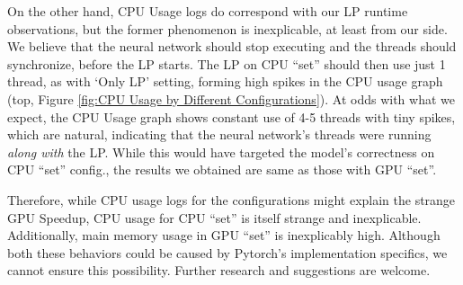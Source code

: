 \begin{appendices}
    On the other hand, CPU Usage logs do correspond with our LP runtime observations, but the former phenomenon is inexplicable, at least from our side. We believe that the neural network should stop executing and the threads should synchronize, before the LP starts. The LP on CPU ``set'' should then use just 1 thread, as with `Only LP' setting, forming high spikes in the CPU usage graph (top, Figure \ref{fig:CPU Usage by Different Configurations}). At odds with what we expect, the CPU Usage graph shows constant use of 4-5 threads with tiny spikes, which are natural, indicating that the neural network's threads were running \textit{along with} the LP. While this would have targeted the model's correctness on CPU ``set'' config., the results we obtained are same as those with GPU ``set''.
    
    Therefore, while CPU usage logs for the configurations might explain the strange GPU Speedup, CPU usage for CPU ``set'' is itself strange and inexplicable. Additionally, main memory usage in GPU ``set'' is inexplicably high. Although both these behaviors could be caused by Pytorch's implementation specifics, we cannot ensure this possibility. Further research and suggestions are welcome.
\end{appendices}